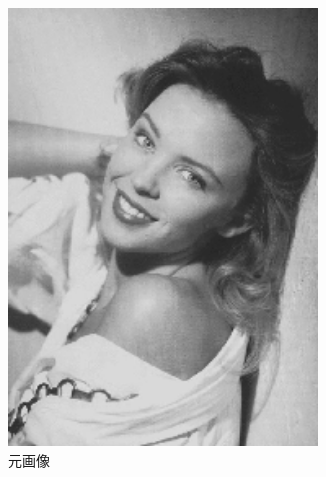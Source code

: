 \documentclass[a4paper,12pt]{jsarticle}
\begin{document}
\begin{figure}[!htbp]
\centering
\begin{subfigure}[b]{0.45\textwidth}
    \centering
    \includegraphics[width=0.9\textwidth]{./sampleimages/sample8.png}
    \caption{元画像}
\end{subfigure}
\hfill
\begin{subfigure}[b]{0.45\textwidth}
    \centering

\end{subfigure}
\end{figure}
\end{document}
